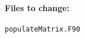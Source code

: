 \documentclass[12pt]{article}
\newcommand{\p}{\partial}
\newcommand{\na}{\nabla}
\begin{document}

\paragraph*{\textbf{Files to change:}}
\begin{verbatim}
populateMatrix.F90
\end{verbatim}
\end{document}
